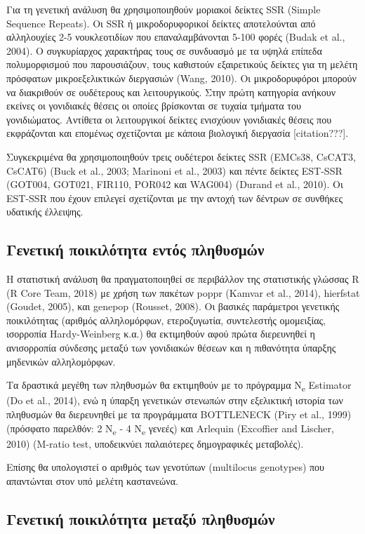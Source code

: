 \documentclass[12pt,a4paper,]{report}
\begin{document}
Για τη γενετική ανάλυση θα χρησιμοποιηθούν μοριακοί δείκτες SSR (Simple
Sequence Repeats). Οι SSR ή μικροδορυφορικοί δείκτες αποτελούνται από
αλληλουχίες 2-5 νουκλεοτιδίων που επαναλαμβάνονται 5-100 φορές (Budak et
al., 2004). Ο συγκυρίαρχος χαρακτήρας τους σε συνδυασμό με τα υψηλά
επίπεδα πολυμορφισμού που παρουσιάζουν, τους καθιστούν εξαιρετικούς
δείκτες για τη μελέτη πρόσφατων μικροεξελικτικών διεργασιών (Wang,
2010). Οι μικροδορυφόροι μπορούν να διακριθούν σε ουδέτερους και
λειτουργικούς. Στην πρώτη κατηγορία ανήκουν εκείνες οι γονιδιακές θέσεις
οι οποίες βρίσκονται σε τυχαία τμήματα του γονιδιώματος. Αντίθετα οι
λειτουργικοί δείκτες ενισχύουν γονιδιακές θέσεις που εκφράζονται και
επομένως σχετίζονται με κάποια βιολογική διεργασία {[}citation???{]}.

Συγκεκριμένα θα χρησιμοποιηθούν τρεις ουδέτεροι δείκτες SSR (EMCs38,
CsCAT3, CsCAT6) (Buck et al., 2003; Marinoni et al., 2003) και πέντε
δείκτες EST-SSR (GOT004, GOT021, FIR110, POR042 και WAG004) (Durand et
al., 2010). Οι EST-SSR που έχουν επιλεγεί σχετίζονται με την αντοχή των
δέντρων σε συνθήκες υδατικής έλλειψης.

\hypertarget{---}{%
\subsection{Γενετική ποικιλότητα εντός πληθυσμών}\label{---}}

Η στατιστική ανάλυση θα πραγματοποιηθεί σε περιβάλλον της στατιστικής
γλώσσας R (R Core Team, 2018) με χρήση των πακέτων poppr (Kamvar et al.,
2014), hierfstat (Goudet, 2005), και genepop (Rousset, 2008). Οι βασικές
παράμετροι γενετικής ποικιλότητας (αριθμός αλληλομόρφων, ετεροζυγωτία,
συντελεστής ομομειξίας, ισορροπία Hardy-Weinberg κ.α.) θα εκτιμηθούν
αφού πρώτα διερευνηθεί η ανισορροπία σύνδεσης μεταξύ των γονιδιακών
θέσεων και η πιθανότητα ύπαρξης μηδενικών αλληλομόρφων.

Τα δραστικά μεγέθη των πληθυσμών θα εκτιμηθούν με το πρόγραμμα
N\textsubscript{e} Estimator (Do et al., 2014), ενώ η ύπαρξη γενετικών
στενωπών στην εξελικτική ιστορία των πληθυσμών θα διερευνηθεί με τα
προγράμματα BOTTLENECK (Piry et al., 1999) (πρόσφατο παρελθόν: 2
N\textsubscript{e} - 4 N\textsubscript{e} γενεές) και Arlequin
(Excoffier and Lischer, 2010) (M-ratio test, υποδεικνύει παλαιότερες
δημογραφικές μεταβολές).

Επίσης θα υπολογιστεί ο αριθμός των γενοτύπων (multilocus genotypes) που
απαντώνται στον υπό μελέτη καστανεώνα.

\hypertarget{---}{%
\subsection{Γενετική ποικιλότητα μεταξύ πληθυσμών}\label{---}}
\end{document}
